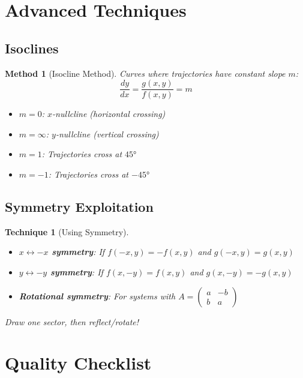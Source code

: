 \documentclass[12pt]{article}
\newtheorem{method}{Method}
\newtheorem{technique}{Technique}
\begin{document}
\section{Advanced Techniques}

\subsection{Isoclines}

\begin{method}[Isocline Method]
Curves where trajectories have constant slope $m$:
$$\frac{dy}{dx} = \frac{g(x,y)}{f(x,y)} = m$$
\begin{itemize}
    \item $m = 0$: $x$-nullcline (horizontal crossing)
    \item $m = \infty$: $y$-nullcline (vertical crossing)
    \item $m = 1$: Trajectories cross at $45°$
    \item $m = -1$: Trajectories cross at $-45°$
\end{itemize}
\end{method}

\subsection{Symmetry Exploitation}

\begin{technique}[Using Symmetry]
\begin{itemize}
    \item \textbf{$x \leftrightarrow -x$ symmetry}: If $f(-x,y) = -f(x,y)$ and $g(-x,y) = g(x,y)$
    \item \textbf{$y \leftrightarrow -y$ symmetry}: If $f(x,-y) = f(x,y)$ and $g(x,-y) = -g(x,y)$
    \item \textbf{Rotational symmetry}: For systems with $A = \begin{pmatrix} a & -b \\ b & a \end{pmatrix}$
\end{itemize}
Draw one sector, then reflect/rotate!
\end{technique}

\section{Quality Checklist}
\end{document}
